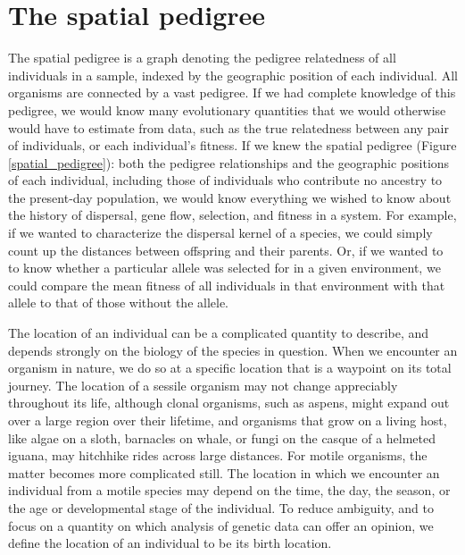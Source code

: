 \documentclass{ar-1col}
\newcommand{\todo}[1]{{\textbf{\color{red}{#1}}}}
\begin{document}
\section{The spatial pedigree}

\todo{read through and edit}

The spatial pedigree is
a graph denoting the pedigree relatedness of all individuals in a sample,
indexed by the geographic position of each individual.
All organisms are connected by a vast pedigree.
If we had complete knowledge of this pedigree,
we would know many evolutionary quantities
that we would otherwise would have to estimate from data,
such as the true relatedness between any pair of individuals,
or each individual's fitness.
If we knew the spatial pedigree (Figure \ref{spatial_pedigree}):
both the pedigree relationships
and the geographic positions of each individual,
including those of individuals
who contribute no ancestry to the present-day population,
we would know everything we wished to know about
the history of dispersal, gene flow,
selection, and fitness in a system.
For example, if we wanted to characterize the dispersal kernel of a species,
we could simply count up the distances between offspring and their parents.
Or, if we wanted to to know whether a particular allele
was selected for in a given environment,
we could compare the mean fitness of all individuals in that environment with that allele
to that of those without the allele.

The location of an individual can be a complicated quantity to describe,
and depends strongly on the biology of the species in question.
When we encounter an organism in nature,
we do so at a specific location
that is a waypoint on its total journey.
The location of a sessile organism
may not change appreciably throughout its life,
although clonal organisms,
such as aspens,
might expand out over a large region over their lifetime,
and organisms that grow on a living host,
like algae on a sloth,
barnacles on whale,
or fungi on the casque of a helmeted iguana,
may hitchhike rides across large distances.
For motile organisms,
the matter becomes more complicated still.
The location in which we encounter an individual
from a motile species may depend
on the time, the day, the season,
or the age or developmental stage of the individual.
To reduce ambiguity,
and to focus on a quantity
on which analysis of genetic data can offer an opinion,
we define the location of an individual to be its birth location.
\end{document}
